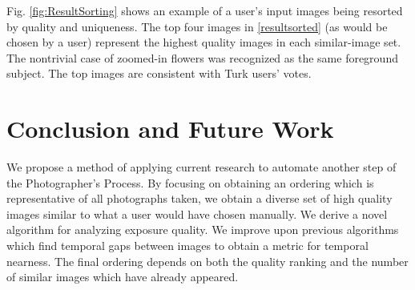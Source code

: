 \documentclass{article}
\begin{document}

Fig. \ref{fig:ResultSorting} shows an example of a user's input images being resorted by quality and uniqueness. The top four images in \ref{resultsorted} (as would be chosen by a user) represent the highest quality images in each similar-image set. The nontrivial case of zoomed-in flowers was recognized as the same foreground subject. The top images are consistent with Turk users' votes.


\section{Conclusion and Future Work}
We propose a method of applying current research to automate another step of the Photographer's Process. By focusing on obtaining an ordering which is representative of all photographs taken, we obtain a diverse set of high quality images similar to what a user would have chosen manually. We derive a novel algorithm for analyzing exposure quality. We improve upon previous algorithms which find temporal gaps between images to obtain a metric for temporal nearness. The final ordering depends on both the quality ranking and the number of similar images which have already appeared.
\end{document}
